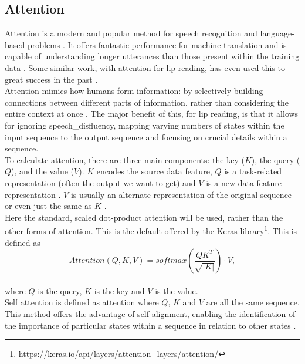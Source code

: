 \subsection{Attention}
\label{sec: Attention}
Attention is a modern and popular method for speech recognition and language-based problems \cite{Effective-Approaches-to-Attention-based-Neural-Machine-Translation}. It offers fantastic performance for machine translation and is capable of understanding longer utterances than those present within the training data \cite{Attention-based-models-for-speech-recognition}. Some similar work, with attention for lip reading, has even used this to great success in the past \cite{lipreading_with_attention}.\\
Attention mimics how humans form information: by selectively building connections between different parts of information, rather than considering the entire context at once \cite{A-review-on-the-attention-mechanism}. The major benefit of this, for lip reading, is that it allows for ignoring \gls{speech_disfluency}, mapping varying numbers of states within the input sequence to the output sequence and focusing on crucial details within a sequence.\\
To calculate attention, there are three main components: the key ($K$), the query ($Q$), and the value ($V$). $K$ encodes the source data feature, $Q$ is a task-related representation (often the output we want to get) and $V$ is a new data feature representation \cite{A-review-on-the-attention-mechanism}. $V$ is usually an alternate representation of the original sequence or even just the same as $K$ \cite{A-review-on-the-attention-mechanism}.\\ 
Here the standard, scaled dot-product attention will be used, rather than the other forms of attention. This is the default offered by the Keras library\footnote{\url{https://keras.io/api/layers/attention_layers/attention/}}. This is defined as
\[Attention(Q, K, V) = softmax(\frac{QK^{T}}{\sqrt{|K|}}) \cdot V,\]\\
where $Q$ is the query, $K$ is the key and $V$ is the value.\\
Self attention is defined as attention where $Q$, $K$ and $V$ are all the same sequence. This method offers the advantage of self-alignment, enabling the identification of the importance of particular states within a sequence in relation to other states \cite{self_attention}.
